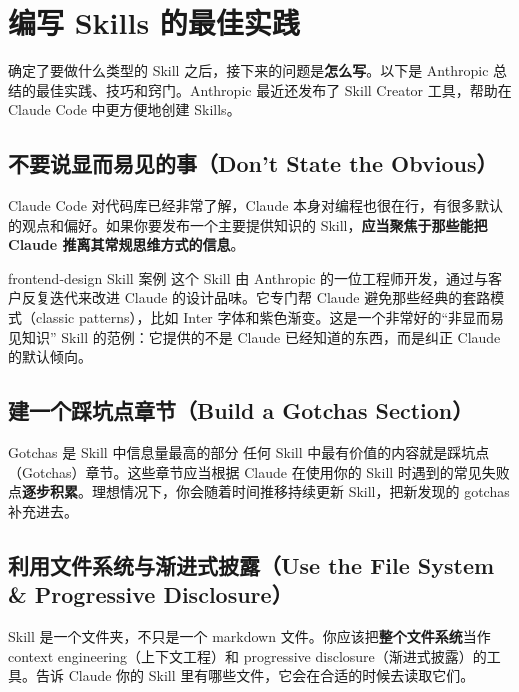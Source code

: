 \section{编写 Skills 的最佳实践}

确定了要做什么类型的 Skill 之后，接下来的问题是\textbf{怎么写}。以下是 Anthropic 总结的最佳实践、技巧和窍门。Anthropic 最近还发布了 Skill Creator 工具，帮助在 Claude Code 中更方便地创建 Skills。

\subsection{不要说显而易见的事（Don't State the Obvious）}

Claude Code 对代码库已经非常了解，Claude 本身对编程也很在行，有很多默认的观点和偏好。如果你要发布一个主要提供知识的 Skill，\textbf{应当聚焦于那些能把 Claude 推离其常规思维方式的信息}。

\begin{knowledgebox}{frontend-design Skill 案例}
这个 Skill 由 Anthropic 的一位工程师开发，通过与客户反复迭代来改进 Claude 的设计品味。它专门帮 Claude 避免那些经典的套路模式（classic patterns），比如 Inter 字体和紫色渐变。这是一个非常好的``非显而易见知识'' Skill 的范例：它提供的不是 Claude 已经知道的东西，而是纠正 Claude 的默认倾向。
\end{knowledgebox}

\subsection{建一个踩坑点章节（Build a Gotchas Section）}

\begin{importantbox}{Gotchas 是 Skill 中信息量最高的部分}
任何 Skill 中最有价值的内容就是踩坑点（Gotchas）章节。这些章节应当根据 Claude 在使用你的 Skill 时遇到的常见失败点\textbf{逐步积累}。理想情况下，你会随着时间推移持续更新 Skill，把新发现的 gotchas 补充进去。
\end{importantbox}

\subsection{利用文件系统与渐进式披露（Use the File System \& Progressive Disclosure）}

Skill 是一个文件夹，不只是一个 markdown 文件。你应该把\textbf{整个文件系统}当作 context engineering（上下文工程）和 progressive disclosure（渐进式披露）的工具。告诉 Claude 你的 Skill 里有哪些文件，它会在合适的时候去读取它们。

